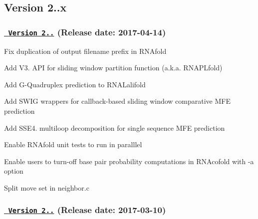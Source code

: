 \subsection*{Version 2..\+x}

\subsubsection*{\href{https://github.com/ViennaRNA/ViennaRNA/compare/v2.3.4...v2.3.5}{\texttt{ Version 2..}} (Release date\+: 2017-\/04-\/14)}


\begin{DoxyItemize}
\item Fix duplication of output filename prefix in R\+N\+Afold
\item Add V3. A\+PI for sliding window partition function (a.\+k.\+a. R\+N\+A\+P\+Lfold)
\item Add G-\/\+Quadruplex prediction to R\+N\+A\+Lalifold
\item Add S\+W\+IG wrappers for callback-\/based sliding window comparative M\+FE prediction
\item Add S\+S\+E4. multiloop decomposition for single sequence M\+FE prediction
\item Enable R\+N\+Afold unit tests to run in paralllel
\item Enable users to turn-\/off base pair probability computations in R\+N\+Acofold with -\/a option
\item Split move set in neighbor.\+c
\end{DoxyItemize}

\subsubsection*{\href{https://github.com/ViennaRNA/ViennaRNA/compare/v2.3.3...v2.3.4}{\texttt{ Version 2..}} (Release date\+: 2017-\/03-\/10)}


